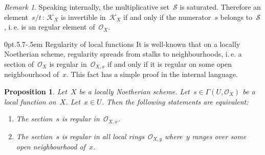 \documentclass[10pt,reqno,a4paper]{amsbook}
\makeatletter
\theoremstyle{definition}
\theoremstyle{plain}
\newtheorem{prop}[defn]{Proposition}
\theoremstyle{remark}
\newtheorem{rem}[defn]{Remark}
\renewcommand{\O}{\mathcal{O}}
\newcommand{\K}{\mathcal{K}}
\newcommand{\T}{\mathcal{T}}
\renewcommand{\S}{\mathcal{S}}
\newcommand{\?}{\,{:}\,}
\renewcommand{\_}{\mathpunct{.}\,}
\newcommand{\ie}{i.\,e.\@\xspace}
\def\subsection{\@startsection{subsection}{2}%
  {0pt}{.5\linespacing\@plus.7\linespacing}{-.5em}%
  {\normalfont\bfseries}}
\makeatother
\begin{document}
\begin{rem}Speaking internally, the multiplicative set~$\S$ is saturated.
Therefore an element~$s/t \? \K_X$ is invertible in~$\K_X$ if and only if the
numerator~$s$ belongs to~$\S$, \ie is an regular element of~$\O_X$.\end{rem}

%


\subsection{Regularity of local functions}
It is well-known that on a locally Noetherian scheme, regularity spreads from
stalks to neighbourhoods, \ie a section of~$\O_X$ is regular
in~$\O_{X,x}$ if and only if it is regular on some open neighbourhood of~$x$.
This fact has a simple proof in the internal language.
\begin{prop}\label{prop:regularity-spreading}
Let~$X$ be a locally Noetherian scheme. Let~$s \in \Gamma(U,\O_X)$
be a local function on~$X$. Let~$x \in U$. Then the following statements are
equivalent:
\begin{enumerate}
\item The section~$s$ is regular in~$\O_{X,x}$.
\item The section~$s$ is regular in all local rings~$\O_{X,y}$ where~$y$ ranges
over some open neighbourhood of~$x$.
\end{enumerate}
\end{prop}
\end{document}
